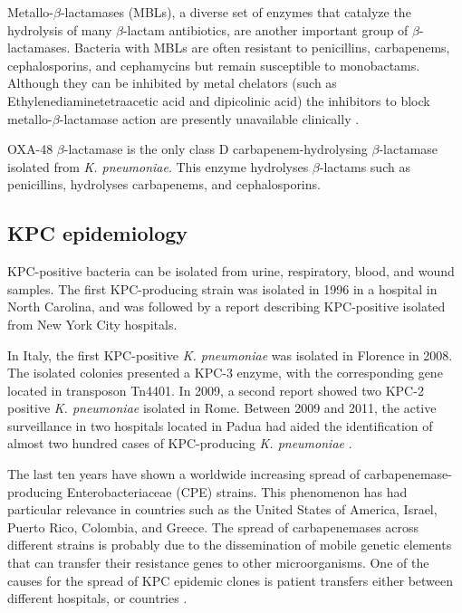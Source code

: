 \documentclass[11pt]{report}
\begin{document}
Metallo-$\beta$-lactamases (MBLs), a diverse set of enzymes that catalyze the hydrolysis of many $\beta$-lactam antibiotics, are another important group of $\beta$-lactamases.
Bacteria with MBLs are often resistant to penicillins, carbapenems, cephalosporins, and cephamycins but remain susceptible to monobactams. Although they can be inhibited by metal chelators (such as Ethylenediaminetetraacetic acid and dipicolinic acid) the inhibitors to block metallo-$\beta$-lactamase action are presently unavailable clinically \cite{palzkill2013metallo}.

OXA-48 $\beta$-lactamase is the only class D carbapenem-hydrolysing $\beta$-lactamase isolated from \emph{K. pneumoniae}.
This enzyme hydrolyses $\beta$-lactams such as penicillins, hydrolyses carbapenems, and cephalosporins.


\subsection{KPC epidemiology}

KPC-positive bacteria can be isolated from urine, respiratory, blood, and wound samples.
The first KPC-producing strain was isolated in 1996 in a hospital in North Carolina, and was followed by a report describing KPC-positive isolated from New York City hospitals.

In Italy, the first KPC-positive \emph{K. pneumoniae} was isolated in Florence in 2008.
The isolated colonies presented a KPC-3 enzyme, with the corresponding gene located in transposon Tn4401.
In 2009, a second report showed two KPC-2 positive \emph{K. pneumoniae} isolated in Rome.
Between 2009 and 2011, the active surveillance in two hospitals located in Padua had aided the identification of almost two hundred cases of KPC-producing \emph{K. pneumoniae} \cite{MunozPrice2013}.

The last ten years have shown a worldwide increasing spread of carbapenemase-producing Enterobacteriaceae (CPE) strains.
This phenomenon has had particular relevance in countries such as the United States of America, Israel, Puerto Rico, Colombia, and Greece.
The spread of carbapenemases across different strains is probably due to the dissemination of mobile genetic elements that can transfer their resistance genes to other microorganisms.
One of the causes for the spread of KPC epidemic clones is patient transfers either between different hospitals, or countries \cite{circolare2013}.

\clearpage
\end{document}
